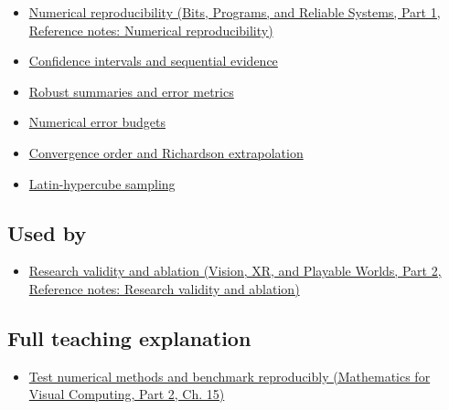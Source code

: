\begin{itemize}
\tightlist
\item
  \href{../01-Bits-Programs-and-Reliable-Systems-P01/main.pdf\#nameddest=appendix-5f1a2c3f97ff}{Numerical reproducibility (Bits, Programs, and Reliable Systems, Part 1, Reference notes: Numerical reproducibility)}
\item
  \hyperref[appendix-c83016554b1e]{Confidence intervals and sequential evidence}
\item
  \hyperref[appendix-bcc44e9d3d02]{Robust summaries and error metrics}
\item
  \hyperref[appendix-31b8c295e05f]{Numerical error budgets}
\item
  \hyperref[appendix-aca80b6bf17a]{Convergence order and Richardson extrapolation}
\item
  \hyperref[appendix-1c5e85693a06]{Latin-hypercube sampling}
\end{itemize}

\subsection{Used by}\label{appendix-b9db93e28371-used-by}

\hypertarget{appendix-b9db93e28371-used-by}{}

\begin{itemize}
\tightlist
\item
  \href{../07-Vision-XR-and-Playable-Worlds-P02/main.pdf\#nameddest=appendix-65788587ef78}{Research validity and ablation (Vision, XR, and Playable Worlds, Part 2, Reference notes: Research validity and ablation)}
\end{itemize}

\subsection{Full teaching explanation}\label{appendix-b9db93e28371-full-teaching-explanation}

\hypertarget{appendix-b9db93e28371-full-teaching-explanation}{}

\begin{itemize}
\tightlist
\item
  \href{../02-Mathematics-for-Visual-Computing-P02/main.pdf\#nameddest=02-foundations-ii-ch031-test-numerical-methods-and-benchmark-reproducibly}{Test numerical methods and benchmark reproducibly (Mathematics for Visual Computing, Part 2, Ch. 15)}
\end{itemize}

